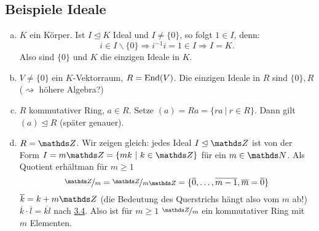 \subsection{Beispiele Ideale}
\label{sub:bsp_ideale}
\begin{enumerate}[(a)]
	\item $K$ ein Körper. Ist $I\trianglelefteq K$ Ideal und $I\neq \{0\}$, so folgt $1\in I$, denn:
	\[
	i\in I\backslash\{0\}\Rightarrow i^{-1}i=1\in I \Rightarrow I=K.
	\]
	Also sind $\{0\}$ und $K$ die einzigen Ideale in $K$.
	\item $V\neq \{0\}$ ein $K$-Vektorraum, $R=\operatorname{End}(V)$. Die einzigen Ideale in $R$ sind $\{0\},R$ ($\rightsquigarrow$ höhere Algebra?)
	\item $R$ kommutativer Ring, $a\in R$. Setze $(a)=Ra=\{ra~|~r\in R\}$. Dann gilt $(a)\trianglelefteq R$ (später genauer).
	\item $R=\Z$. Wir zeigen gleich: jedes Ideal $I\trianglelefteq \Z$ ist von der Form $I=m\Z=\{mk~|~k\in \Z\}$ für ein $m\in \N$. Als Quotient erhältman für $m\ge 1$
	\[
	\nicefrac{\Z}{m}=\nicefrac{\Z}{m\Z}=\{\overline{0},\dots,\overline{m-1},\overline{m}=\overline{0} \}
	\]
	$\overline{k}=k+m\Z$ (die Bedeutung des Querstrichs hängt also vom $m$ ab!)\\
	$\overline{k}\cdot\overline{l}=\overline{kl}$ nach \hyperref[sub:homomor_ideale]{3.4}. Also ist für $m\ge 1$ $\nicefrac{\Z}{m}$ ein kommutativer Ring mit $m$ Elementen.
\end{enumerate}


















\cleardoubleoddemptypage
{}
\setcounter{page}{1}




\printindex
\listoffigures
